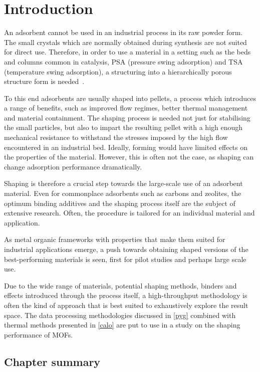 
\section{Introduction}

An adsorbent cannot be used in an industrial process in its raw powder
form. The small crystals which are normally obtained during synthesis
are not suited for direct use. Therefore, in order to use a 
material in a setting such 
as the beds and columns common in catalysis, PSA (pressure swing 
adsorption) and TSA (temperature swing adsorption), a structuring 
into a hierarchically porous structure form is 
needed~\cite{akhtarStructuringAdsorbentsCatalysts2014}.

To this end adsorbents are usually shaped into pellets, a process
which introduces a range of benefits, such as improved flow regimes,
better thermal management and material containment. The shaping process
is needed not just for stabilising the small particles, but also to
impart the resulting pellet with a high enough mechanical resistance 
to withstand the stresses imposed by the high flow encountered in 
an industrial bed. Ideally, forming would have limited effects on
the properties of the material. However, this is often not the case, 
as shaping can change adsorption performance dramatically.

Shaping is therefore a crucial step towards the large-scale
use of an adsorbent material. Even for commonplace adsorbents such as
carbons and zeolites, the optimum binding additives and the shaping
process itself are the subject of extensive research. Often, the
procedure is tailored for an individual material and application.

As metal organic frameworks with properties that make them suited 
for industrial applications emerge, a push towards obtaining shaped
versions of the best-performing materials is seen, first for 
pilot studies and perhaps large scale use.

Due to the wide range of materials, potential shaping methods, binders 
and effects introduced through the process itself, a high-throughput
methodology is often the kind of approach that is best suited to 
exhaustively explore the result space. The data processing methodologies
discussed in \autoref{pyg} combined with thermal methods
presented in \autoref{calo} are put to use in a study on the 
shaping performance of MOFs.

\subsection*{Chapter summary}

